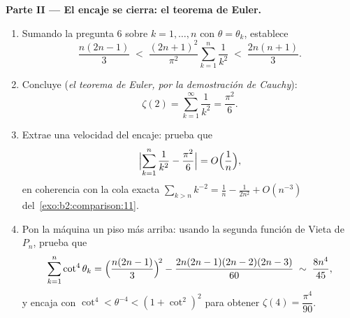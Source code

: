 \begin{problem}[{Problema de fin de semana --- $\zeta(2) = \pi^2/6$ y
el panorama de Bertrand}]
\medskip
\noindent\textbf{Parte II --- El encaje se cierra: el teorema de
Euler.}
\begin{enumerate}[resume]
  \item Sumando la pregunta 6 sobre $k = 1, \dots, n$ con $\theta =
        \theta_k$, establece
        \[
        \frac{n(2n-1)}{3} \;<\;
        \frac{(2n+1)^2}{\pi^2}\sum_{k=1}^{n}\frac1{k^2}
        \;<\; \frac{2n(n+1)}{3}.
        \]
  \item Concluye (\emph{el teorema de Euler, por la demostración de
        Cauchy}):
        \[
        \zeta(2) = \sum_{k=1}^{\infty}\frac{1}{k^2} =
        \frac{\pi^2}{6}.
        \]
  \item Extrae una velocidad del encaje: prueba que
        \[
        \Bigl|\sum_{k=1}^{n}\frac1{k^2} - \frac{\pi^2}6\Bigr|
        = O\Bigl(\frac1n\Bigr),
        \]
        en coherencia con la cola exacta $\sum_{k>n}k^{-2} =
        \frac1n - \frac{1}{2n^2} + O(n^{-3})$ del~\cref{exo:b2:comparison:11}.
  \item Pon la máquina un piso más arriba: usando la segunda función
        de Vieta de $P_n$, prueba que
        \[
        \sum_{k=1}^{n}\cot^4\theta_k =
        \Bigl(\frac{n(2n-1)}3\Bigr)^{\!2} -
        \frac{2n(2n-1)(2n-2)(2n-3)}{60}
        \;\sim\; \frac{8n^4}{45},
        \]
        y encaja con $\cot^4 < \theta^{-4} < (1 + \cot^2)^2$ para
        obtener $\zeta(4) = \dfrac{\pi^4}{90}$.
\end{enumerate}


\end{problem}
